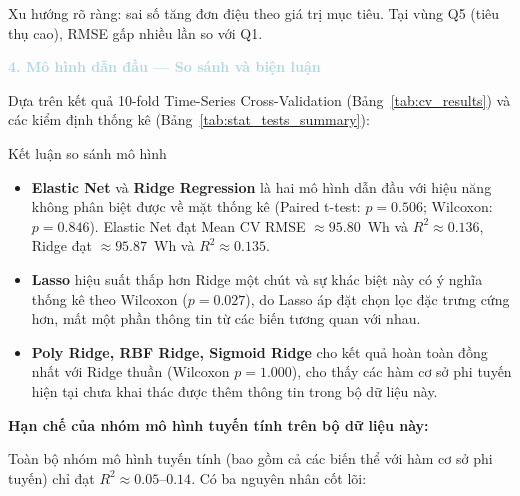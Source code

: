 Xu hướng rõ ràng: sai số tăng đơn điệu theo giá trị mục tiêu. Tại vùng Q5 (tiêu thụ cao),
RMSE gấp nhiều lần so với Q1.

\noindent\textcolor{lightblue}{\textbf{4. Mô hình dẫn đầu --- So sánh và biện luận}}

Dựa trên kết quả 10-fold Time-Series Cross-Validation (Bảng~\ref{tab:cv_results}) và
các kiểm định thống kê (Bảng~\ref{tab:stat_tests_summary}):

\begin{notebox}{Kết luận so sánh mô hình}
\begin{itemize}
    \item \textbf{Elastic Net} và \textbf{Ridge Regression} là hai mô hình dẫn đầu với
          hiệu năng không phân biệt được về mặt thống kê (Paired t-test: $p = 0.506$;
          Wilcoxon: $p = 0.846$). Elastic Net đạt Mean CV RMSE $\approx 95.80$~Wh
          và $R^2 \approx 0.136$, Ridge đạt $\approx 95.87$~Wh và $R^2 \approx 0.135$.

    \item \textbf{Lasso} hiệu suất thấp hơn Ridge một chút và sự khác biệt này có ý
          nghĩa thống kê theo Wilcoxon ($p = 0.027$), do Lasso áp đặt chọn lọc đặc trưng
          cứng hơn, mất một phần thông tin từ các biến tương quan với nhau.

    \item \textbf{Poly Ridge, RBF Ridge, Sigmoid Ridge} cho kết quả hoàn toàn đồng nhất
          với Ridge thuần (Wilcoxon $p = 1.000$), cho thấy các hàm cơ sở phi tuyến hiện
          tại chưa khai thác được thêm thông tin trong bộ dữ liệu này.
\end{itemize}
\end{notebox}

\noindent\textbf{Hạn chế của nhóm mô hình tuyến tính trên bộ dữ liệu này:}

Toàn bộ nhóm mô hình tuyến tính (bao gồm cả các biến thể với hàm cơ sở phi tuyến) chỉ
đạt $R^2 \approx 0.05$--$0.14$. Có ba nguyên nhân cốt lõi:

